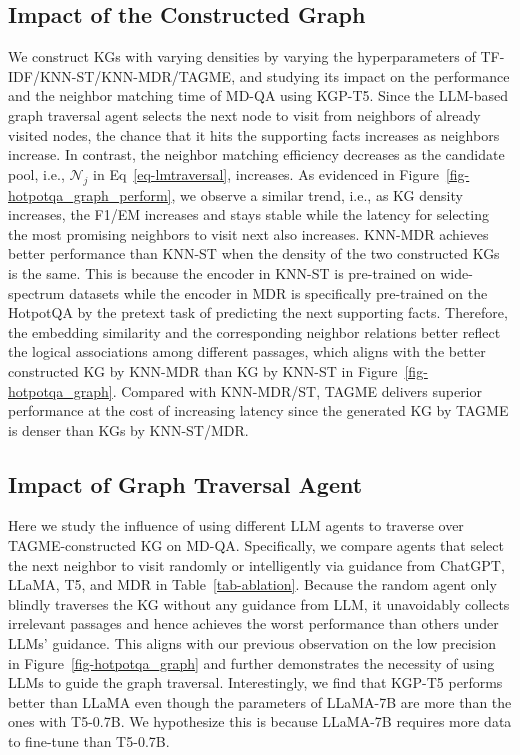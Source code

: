 \subsection{Impact of the Constructed Graph}\label{sec-graphimpact}
We construct KGs with varying densities by varying the hyperparameters of TF-IDF/KNN-ST/KNN-MDR/TAGME, and studying its impact on the performance and the neighbor matching time of MD-QA using KGP-T5. Since the LLM-based graph traversal agent selects the next node to visit from neighbors of already visited nodes, the chance that it hits the supporting facts increases as neighbors increase. In contrast, the neighbor matching efficiency decreases as the candidate pool, i.e., $\mathcal{N}_j$ in Eq~\eqref{eq-lmtraversal}, increases. As evidenced in Figure~\ref{fig-hotpotqa_graph_perform}, we observe a similar trend, i.e., as KG density increases, the F1/EM increases and stays stable while the latency for selecting the most promising neighbors to visit next also increases. KNN-MDR achieves better performance than KNN-ST when the density of the two constructed KGs is the same. This is because the encoder in KNN-ST is pre-trained on wide-spectrum datasets while the encoder in MDR is specifically pre-trained on the HotpotQA by the pretext task of predicting the next supporting facts. Therefore, the embedding similarity and the corresponding neighbor relations better reflect the logical associations among different passages, which aligns with the better constructed KG by KNN-MDR than KG by KNN-ST in Figure~\ref{fig-hotpotqa_graph}. Compared with KNN-MDR/ST, TAGME delivers superior performance at the cost of increasing latency since the generated KG by TAGME is denser than KGs by KNN-ST/MDR.





\vspace{-1ex}
\subsection{Impact of Graph Traversal Agent}\label{sec-LLMimpact}
Here we study the influence of using different LLM agents to traverse over TAGME-constructed KG on MD-QA. Specifically, we compare agents that select the next neighbor to visit randomly or intelligently via guidance from ChatGPT, LLaMA, T5, and MDR in Table~\ref{tab-ablation}. Because the random agent only blindly traverses the KG without any guidance from LLM, it unavoidably collects irrelevant passages and hence achieves the worst performance than others under LLMs' guidance. This aligns with our previous observation on the low precision in Figure~\ref{fig-hotpotqa_graph} and further demonstrates the necessity of using LLMs to guide the graph traversal. Interestingly, we find that KGP-T5 performs better than LLaMA even though the parameters of LLaMA-7B are more than the ones with T5-0.7B. We hypothesize this is because LLaMA-7B requires more data to fine-tune than T5-0.7B.



